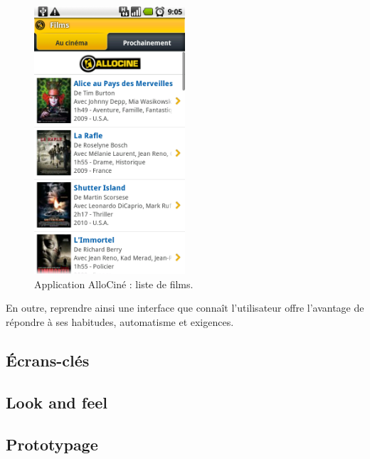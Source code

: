 \documentclass{article}
\begin{document}
	\begin{figure}[ht]
		\centering
		\includegraphics[width=0.5\textwidth]{allocine.png}
		\caption{Application AlloCiné : liste de films.}
		\label{fig:allocine}
	\end{figure}
	
	En outre, reprendre ainsi une interface que connaît l'utilisateur offre l'avantage de répondre à ses habitudes, automatisme	et exigences.
	
	\subsection{Écrans-clés}
	
	
	
	\subsection{Look and feel}
	
	
	
	\subsection{Prototypage}
\end{document}
